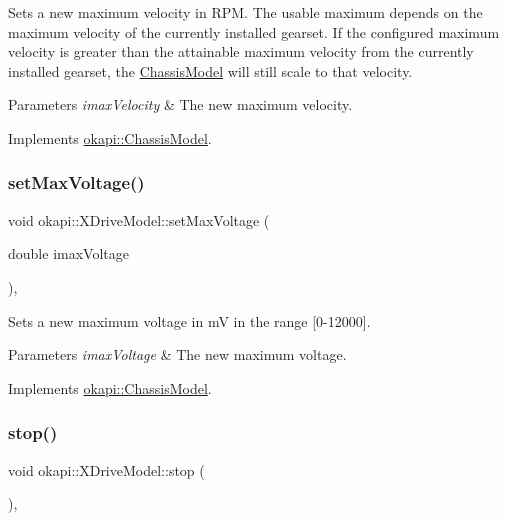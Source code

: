 Sets a new maximum velocity in R\+PM. The usable maximum depends on the maximum velocity of the currently installed gearset. If the configured maximum velocity is greater than the attainable maximum velocity from the currently installed gearset, the \mbox{\hyperlink{classokapi_1_1ChassisModel}{Chassis\+Model}} will still scale to that velocity.


\begin{DoxyParams}{Parameters}
{\em imax\+Velocity} & The new maximum velocity. \\
\hline
\end{DoxyParams}


Implements \mbox{\hyperlink{classokapi_1_1ChassisModel_ae7fcb4cc95fdd7fd3c8f8388b4a698b2}{okapi\+::\+Chassis\+Model}}.

\mbox{\label{classokapi_1_1XDriveModel_a6d001a2147ecb642f60cd21ac73c64ea}} 
\subsubsection{\texorpdfstring{setMaxVoltage()}{setMaxVoltage()}}
{\footnotesize\ttfamily void okapi\+::\+X\+Drive\+Model\+::set\+Max\+Voltage (\begin{DoxyParamCaption}\item[{double}]{imax\+Voltage }\end{DoxyParamCaption})\hspace{0.3cm}{\ttfamily [override]}, {\ttfamily [virtual]}}

Sets a new maximum voltage in mV in the range {\ttfamily \mbox{[}0-\/12000\mbox{]}}.


\begin{DoxyParams}{Parameters}
{\em imax\+Voltage} & The new maximum voltage. \\
\hline
\end{DoxyParams}


Implements \mbox{\hyperlink{classokapi_1_1ChassisModel_a2fb261636b79e118f22530cc3fce4f41}{okapi\+::\+Chassis\+Model}}.

\mbox{\label{classokapi_1_1XDriveModel_a2fe09b755e8a6f321d6365cedc774e04}} 
\subsubsection{\texorpdfstring{stop()}{stop()}}
{\footnotesize\ttfamily void okapi\+::\+X\+Drive\+Model\+::stop (\begin{DoxyParamCaption}{ }\end{DoxyParamCaption})\hspace{0.3cm}{\ttfamily [override]}, {\ttfamily [virtual]}}

